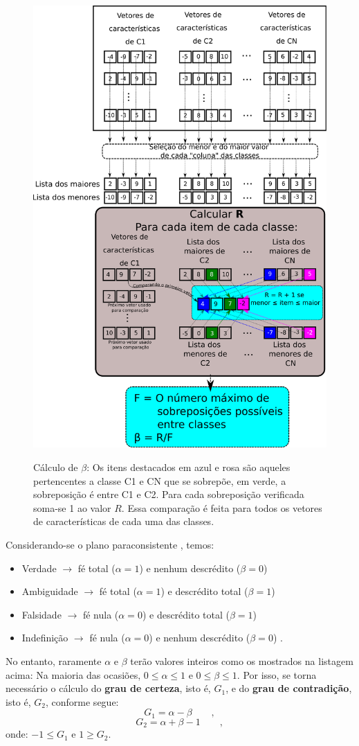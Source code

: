 			\begin{figure}[h]
				\centering
				\caption[Cálculo de $\beta$]{Cálculo de $\beta$: Os itens destacados em azul e rosa são aqueles pertencentes a classe C1 e CN que se sobrepõe, em verde, a sobreposição é entre C1 e C2. Para cada sobreposição verificada soma-se 1 ao valor $R$. Essa comparação é feita para todos os vetores de características de cada uma das classes.}
				\includegraphics[width=0.5\linewidth]{images/betaCalculation.pdf}
				\label{fig:betacalculation}
			\end{figure}
			
			\par Considerando-se o plano paraconsistente \cite{8588433}, temos: 
			
			\begin{itemize}
				\item Verdade $\rightarrow$ fé total ($\alpha = 1$) e nenhum descrédito ($\beta = 0$)
				\item Ambiguidade $\rightarrow$ fé total ($\alpha = 1$) e descrédito total ($\beta = 1$)
				\item Falsidade $\rightarrow$ fé nula ($\alpha = 0$) e descrédito total ($\beta = 1$)
				\item Indefinição $\rightarrow$ fé nula ($\alpha = 0$) e nenhum descrédito ($\beta = 0$) \qquad.
			\end{itemize}
	
			\par No entanto, raramente $\alpha$ e $\beta$ terão valores inteiros como os mostrados na listagem acima: Na maioria das ocasiões, $0 \leqslant \alpha \leqslant 1$ e $0 \leqslant \beta \leqslant 1$. Por isso, se torna necessário o cálculo do \textbf{grau de certeza}, isto é, $G_1$, e do \textbf{grau de contradição}, isto é, $G_2$, conforme segue:
			\begin{equation}
				G_1=\alpha-\beta  \qquad,
			\end{equation}
			\begin{equation}
				G_2=\alpha+\beta-1 \qquad,
			\end{equation}
			onde: $-1 \leqslant G_1$ e  $1 \geqslant G_2$.
			
